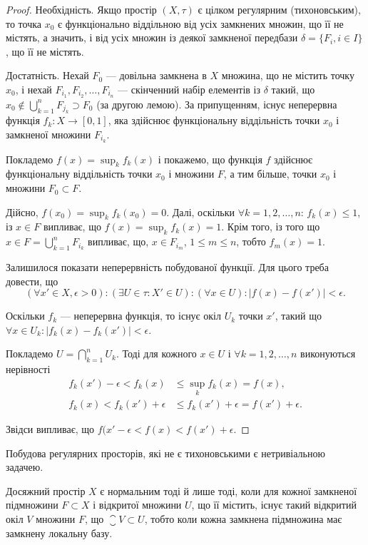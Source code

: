 \begin{proof}
Необхідність. Якщо простір $(X, \tau)$ є
цілком регулярним (тихоновським), то точка $x_0$ є
функціонально віддільною від усіх замкнених множин, що її
не містять, а значить, і від усіх множин із деякої замкненої
передбази $\delta = \{F_i, i \in I\}$, що її не містять.

Достатність. Нехай $F_0$ --- довільна замкнена в $X$
множина, що не містить точку $x_0$, і нехай $F_{i_1}, F_{i_2}, \ldots, F_{i_n}$ ---
скінченний набір елементів із $\delta$ такий, що
$x_0 \notin \bigcup_{k = 1}^n F_{j_k} \supset F_0$ (за другою лемою).
За припущенням, існує неперервна функція $f_k: X \to [0, 1]$, яка здійснює
функціональну віддільність точки $x_0$ і замкненої множини
$F_{i_k}$.

Покладемо $f(x) = \sup_k f_k(x)$ і покажемо, що функція $f$
здійснює функціональну віддільність точки $x_0$ і множини
$F$, а тим більше, точки $x_0$ і множини $F_0 \subset F$.

Дійсно, $f(x_0) = \sup_k f_k(x_0) = 0$. Далі, оскільки
$\forall k = 1, 2, \ldots, n$: $f_k(x) \le 1$, із $x \in F$ випливає, що
$f(x) = \sup_k f_k(x) = 1$. Крім того, із того що
$x \in F = \bigcup_{k = 1}^n F_{i_k}$
випливає, що, $x \in F_{i_m}$, $1 \le m \le n$, тобто $f_m(x) = 1$.

Залишилося показати неперервність побудованої функції.
Для цього треба довести, що \[ (\forall x' \in X, \epsilon > 0): (\exists U \in \tau: X' \in U): (\forall x \in U): |f(x) - f(x')| < \epsilon. \]

Оскільки $f_k$ --- неперервна функція, то існує окіл $U_k$ точки $x'$, такий що
$\forall x \in U_k: |f_k(x) - f_k(x')| < \epsilon$.

Покладемо
$U = \bigcap_{k = 1}^n U_k$. Тоді для кожного $x \in U$ і
$\forall k = 1, 2, \ldots, n$ виконуються нерівності
\begin{align*}
f_k(x') - \epsilon < f_k(x) &\le \sup_k f_k(x) = f(x), \\
f_k(x) < f_k(x') + \epsilon &\le f_k(x') + \epsilon = f(x') + \epsilon.
\end{align*}

Звідси випливає, що $f(x' - \epsilon < f(x) < f(x') + \epsilon$.
\end{proof}

\begin{remark}
Побудова регулярних просторів, які не є
тихоновськими є нетривіальною задачею.
\end{remark}

\begin{theorem}
Досяжний простір $X$ є нормальним тоді й лише тоді, коли
для кожної замкненої підмножини $F \subset X$ і відкритої
множини $U$, що її містить, існує такий відкритий окіл $V$
множини $F$, що $\closure{V} \subset U$, тобто коли кожна замкнена
підмножина має замкнену локальну базу.
\end{theorem}

